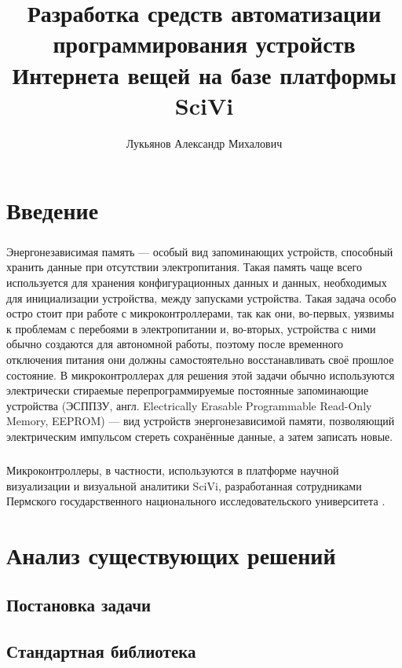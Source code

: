\documentclass{report}
\title{Разработка средств автоматизации программирования устройств Интернета вещей на базе платформы SciVi}
\author{Лукьянов Александр Михалович}
\date{\the\year{}}
\begin{document}
\maketitle

\tableofcontents

\chapter*{Введение}

\paragraph{} Энергонезависимая память --- особый вид запоминающих устройств, способный хранить данные при отсутствии электропитания. Такая память чаще всего используется для хранения конфигурационных данных и данных, необходимых для инициализации устройства, между запусками устройства. Такая задача особо остро стоит при работе с микроконтроллерами, так как они, во-первых, уязвимы к проблемам с перебоями в электропитании и, во-вторых, устройства с ними обычно создаются для автономной работы, поэтому после временного отключения питания они должны самостоятельно восстанавливать своё прошлое состояние. В микроконтроллерах для решения этой задачи обычно используются электрически стираемые перепрограммируемые постоянные запоминающие устройства (ЭСППЗУ, англ. Electrically Erasable Programmable Read-Only Memory, EEPROM) --- вид устройств энергонезависимой памяти, позволяющий электрическим импульсом стереть сохранённые данные, а затем записать новые.

\paragraph{} Микроконтроллеры, в частности, используются в платформе научной визуализации и визуальной аналитики SciVi, разработанная сотрудниками Пермского государственного национального исследовательского университета \cite{SciVi-main}.

\chapter{Анализ существующих решений}

\section{Постановка задачи}

\section{Стандартная библиотека}
\end{document}
